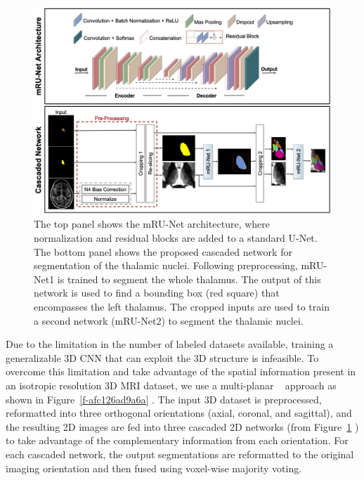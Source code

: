 \documentclass[3p,,final,12pt]{elsarticle}
\begin{document}
\begin{figure}[!htbp]
\centering 
\includegraphics[width=\textwidth]{Thalamus/images/slide1.jpeg}
\caption{The top panel shows the mRU-Net architecture, where normalization and residual blocks are added to a standard U-Net. The bottom panel shows the proposed cascaded network for segmentation of the thalamic nuclei. Following preprocessing, mRU-Net1 is trained to segment the whole thalamus. The output of this network is used to find a bounding box (red square) that encompasses the left thalamus. The cropped inputs are used to train a second network (mRU-Net2) to segment the thalamic nuclei. }
\label{f-49677889c7e1}
\end{figure}



Due to the limitation in the number of labeled datasets available, training a generalizable 3D CNN that can exploit the 3D structure is infeasible. To overcome this limitation and take advantage of the spatial information present in an isotropic resolution 3D MRI dataset, we use a multi-planar \unskip~\cite{1643371:26789950} approach as shown in Figure~\ref{f-afc126ad9a6a} . The input 3D dataset is preprocessed, reformatted into three orthogonal orientations (axial, coronal, and sagittal), and the resulting 2D images are fed into three cascaded 2D networks (from Figure~\ref{f-49677889c7e1} ) to take advantage of the complementary information from each orientation. For each cascaded network, the output segmentations are reformatted to the original imaging orientation and then fused using voxel-wise majority voting.
\end{document}
